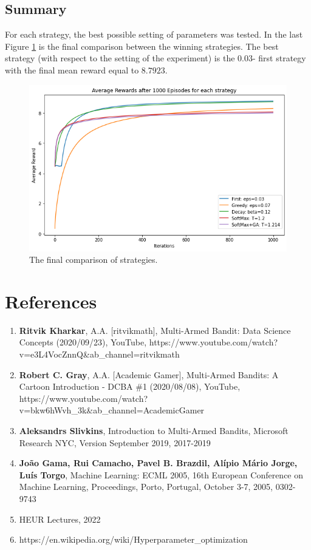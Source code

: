 \documentclass[11pt,american,czech]{article}
\begin{document}
\subsection*{Summary}

For each strategy, the best possible setting of parameters was tested. In the last Figure \ref{fig::all} is the final comparison between the winning strategies. The best strategy (with respect to the setting of the experiment) is the $0.03$- first strategy with the final mean reward equal to $8.7923$.

\begin{figure}[h]
	\centering
	\includegraphics[scale=0.55]{summary.png}
	\caption{The final comparison of strategies.}\label{fig::all}
\end{figure}



	\clearpage
	\section*{References}
	\begin{enumerate}
		\item[1.] \textbf{Ritvik Kharkar}, A.A. [ritvikmath], Multi-Armed Bandit: Data Science Concepts (2020/09/23), YouTube, https://www.youtube.com/watch?v=e3L4VocZnnQ\&ab\_channel=ritvikmath
		\item[2.] \textbf{Robert C. Gray}, A.A. [Academic Gamer], Multi-Armed Bandits: A Cartoon Introduction - DCBA \#1 (2020/08/08), YouTube, \\https://www.youtube.com/watch?v=bkw6hWvh\_3k\&ab\_channel=AcademicGamer
		\item[3.] \textbf{Aleksandrs Slivkins}, Introduction to Multi-Armed Bandits, Microsoft Research NYC, Version September 2019, 2017-2019
		\item[4.] \textbf{João Gama, Rui Camacho, Pavel B. Brazdil, Alípio Mário Jorge, Luís Torgo}, Machine Learning: ECML 2005, 16th European Conference on Machine Learning, Proceedings, Porto, Portugal, October 3-7, 2005, 0302-9743
		\item[5.] HEUR Lectures, 2022
		\item[6.] https://en.wikipedia.org/wiki/Hyperparameter\_optimization
	\end{enumerate}
	
\end{document}

